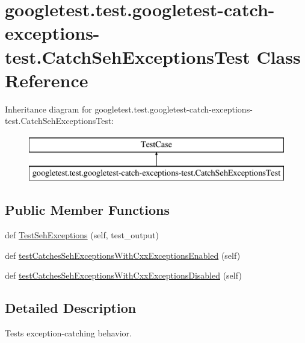 \hypertarget{classgoogletest_1_1test_1_1googletest-catch-exceptions-test_1_1_catch_seh_exceptions_test}{}\section{googletest.\+test.\+googletest-\/catch-\/exceptions-\/test.Catch\+Seh\+Exceptions\+Test Class Reference}
\label{classgoogletest_1_1test_1_1googletest-catch-exceptions-test_1_1_catch_seh_exceptions_test}
Inheritance diagram for googletest.\+test.\+googletest-\/catch-\/exceptions-\/test.Catch\+Seh\+Exceptions\+Test\+:\begin{figure}[H]
\begin{center}
\leavevmode
\includegraphics[height=2.000000cm]{da/dd0/classgoogletest_1_1test_1_1googletest-catch-exceptions-test_1_1_catch_seh_exceptions_test}
\end{center}
\end{figure}
\subsection*{Public Member Functions}
\begin{DoxyCompactItemize}
\item 
def \mbox{\hyperlink{classgoogletest_1_1test_1_1googletest-catch-exceptions-test_1_1_catch_seh_exceptions_test_a1f9a05798bf106a875407ea19e2645c4}{Test\+Seh\+Exceptions}} (self, test\+\_\+output)
\item 
def \mbox{\hyperlink{classgoogletest_1_1test_1_1googletest-catch-exceptions-test_1_1_catch_seh_exceptions_test_ae2bdda9327e3002f3a4f06004eecfd0a}{test\+Catches\+Seh\+Exceptions\+With\+Cxx\+Exceptions\+Enabled}} (self)
\item 
def \mbox{\hyperlink{classgoogletest_1_1test_1_1googletest-catch-exceptions-test_1_1_catch_seh_exceptions_test_ad3024c6b47e2bccc2d42f0eabb0bd2a8}{test\+Catches\+Seh\+Exceptions\+With\+Cxx\+Exceptions\+Disabled}} (self)
\end{DoxyCompactItemize}


\subsection{Detailed Description}
\begin{DoxyVerb}Tests exception-catching behavior.\end{DoxyVerb}
 

